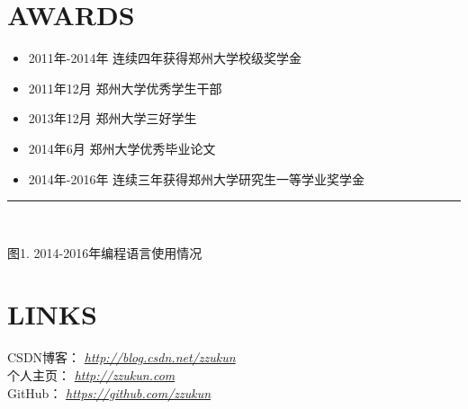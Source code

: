 \documentclass[line, margin]{res}
\newcommand{\xiaowu}{\fontsize{9pt}{15.75pt}\selectfont} %
\begin{document}
\begin{resume}
\section{AWARDS}
\begin{itemize}
\item { 2011年-2014年 连续四年获得郑州大学校级奖学金}
\item { 2011年12月 郑州大学优秀学生干部}
\item { 2013年12月 郑州大学三好学生}
\item { 2014年6月 郑州大学优秀毕业论文}
\item { 2014年-2016年 连续三年获得郑州大学研究生一等学业奖学金}
\end{itemize}

\rule{10.0cm}{0.05em} \\
\begin{center}
{\xiaowu 图1. 2014-2016年编程语言使用情况}
\end{center}

\vspace {20pt}
\section {LINKS}
{ CSDN博客：} {\sl \url{http://blog.csdn.net/zzukun}}\\
[3pt]
{ 个人主页：} {\sl \url{http://zzukun.com}}\\
[3pt]
{ GitHub： } {\sl \url{https://github.com/zzukun}}\\

\end{resume}
\end{document}
